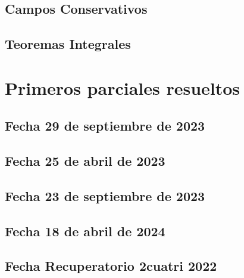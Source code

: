 \documentclass[10pt, a4paper]{report}
\begin{document}
        \section{Campos Conservativos}
            
       
        \section{Teoremas Integrales}
            


    \chapter{Primeros parciales resueltos}
        \section{Fecha 29 de septiembre de 2023}
            

        \newpage
        \section{Fecha 25 de abril de 2023}
            





            \newpage
        \section{Fecha 23 de septiembre de 2023}
            


            \newpage
        \section{Fecha 18 de abril de 2024}
            
            


        \newpage
        \section{Fecha Recuperatorio 2cuatri 2022}
            
\end{document}
